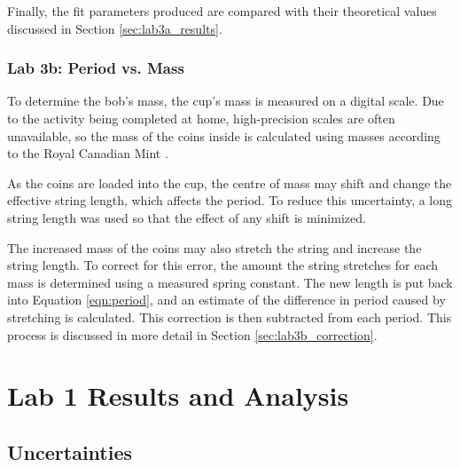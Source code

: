 \documentclass[aps,twocolumn,secnumarabic,nobalancelastpage,amsmath,amssymb,nofootinbib,floatfix,letterpaper]{revtex4}
\begin{document}
Finally, the fit parameters produced are compared with their theoretical values discussed in Section \ref{sec:lab3a_results}.

\subsubsection{Lab 3b: Period vs. Mass}

To determine the bob's mass, the cup's mass is measured on a digital scale. Due to the activity being completed at home,
high-precision scales are often unavailable, so the mass of the coins inside is calculated using masses according to the
Royal Canadian Mint \cite{mint}.

As the coins are loaded into the cup, the centre of mass may shift and change the effective string length, which affects
the period. To reduce this uncertainty, a long string length was used so that the effect of any shift is minimized.

The increased mass of the coins may also stretch the string and increase the string length. To correct for this error,
the amount the string stretches for each mass is determined using a measured spring constant. The new length is put back
into Equation \ref{eqn:period}, and an estimate of the difference in period caused by stretching is calculated. This
correction is then subtracted from each period. This process is discussed in more detail in Section
\ref{sec:lab3b_correction}.


\section{Lab 1 Results and Analysis}

\subsection{Uncertainties}
\label{sec:lab1_uncert}
\end{document}
